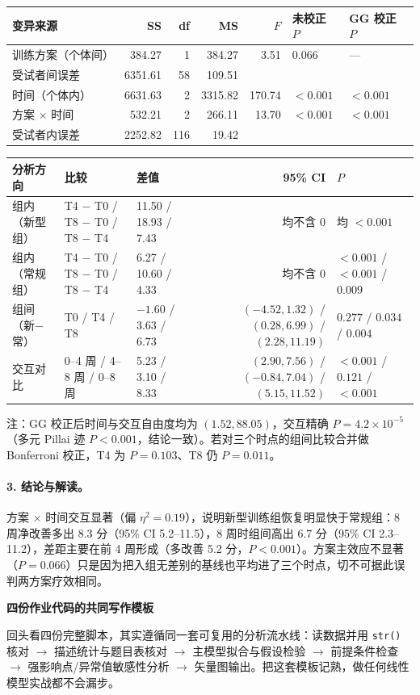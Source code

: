 \begin{tabular}{lrrrrll}
\toprule
变异来源 & SS & df & MS & $F$ & 未校正 $P$ & GG 校正 $P$\\
\midrule
训练方案（个体间） & 384.27   & 1   & 384.27  & 3.51   & 0.066    & ---\\
受试者间误差       & 6351.61  & 58  & 109.51  &        &          & \\
时间（个体内）     & 6631.63  & 2   & 3315.82 & 170.74 & $<0.001$ & $<0.001$\\
方案 $\times$ 时间 & 532.21   & 2   & 266.11  & 13.70  & $<0.001$ & $<0.001$\\
受试者内误差       & 2252.82  & 116 & 19.42   &        &          & \\
\bottomrule
\end{tabular}

\vspace{0.8em}
\begin{tabular}{lllrl}
\toprule
分析方向 & 比较 & 差值 & 95\% CI & $P$\\
\midrule
组内（新型组） & T4 $-$ T0 / T8 $-$ T0 / T8 $-$ T4 & 11.50 / 18.93 / 7.43 & 均不含 0 & 均 $<0.001$\\
组内（常规组） & T4 $-$ T0 / T8 $-$ T0 / T8 $-$ T4 & 6.27 / 10.60 / 4.33  & 均不含 0 & $<0.001$ / $<0.001$ / $0.009$\\
组间（新$-$常）& T0 / T4 / T8                      & $-1.60$ / $3.63$ / $6.73$ & $(-4.52,1.32)$ / $(0.28,6.99)$ / $(2.28,11.19)$ & $0.277$ / $0.034$ / $0.004$\\
交互对比       & 0--4 周 / 4--8 周 / 0--8 周       & 5.23 / 3.10 / 8.33   & $(2.90,7.56)$ / $(-0.84,7.04)$ / $(5.15,11.52)$ & $<0.001$ / $0.121$ / $<0.001$\\
\bottomrule
\end{tabular}

\begin{studysource}
注：GG 校正后时间与交互自由度均为 $(1.52,88.05)$，交互精确 $P=4.2\times 10^{-5}$（多元 Pillai 迹 $P<0.001$，结论一致）。若对三个时点的组间比较合并做 Bonferroni 校正，T4 为 $P=0.103$、T8 仍 $P=0.011$。
\end{studysource}


\paragraph{3. 结论与解读。}方案 $\times$ 时间交互显著（偏 $\eta^2=0.19$），说明新型训练组恢复明显快于常规组：8 周净改善多出 8.3 分（95\% CI 5.2--11.5），8 周时组间高出 6.7 分（95\% CI 2.3--11.2），差距主要在前 4 周形成（多改善 5.2 分，$P<0.001$）。方案主效应不显著（$P=0.066$）只是因为把入组无差别的基线也平均进了三个时点，切不可据此误判两方案疗效相同。


\begin{studyexplain}
\textbf{四份作业代码的共同写作模板}


回头看四份完整脚本，其实遵循同一套可复用的分析流水线：读数据并用 \Verb|str()| 核对 $\to$ 描述统计与题目表核对 $\to$ 主模型拟合与假设检验 $\to$ 前提条件检查 $\to$ 强影响点/异常值敏感性分析 $\to$ 矢量图输出。把这套模板记熟，做任何线性模型实战都不会漏步。

\end{studyexplain}
